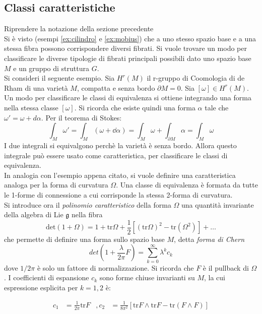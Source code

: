 \subsection{Classi caratteristiche}
Riprendere la notazione della sezione precedente \\

Si è visto (esempi \ref{ex:cilindro} e \ref{ex:mobius}) che a uno stesso spazio
base e a una stessa fibra possono corrispondere diversi fibrati. Si vuole trovare
un modo per classificare le diverse tipologie di fibrati principali possibili dato uno
spazio base $M$ e un gruppo di struttura $G$.\\

Si consideri il seguente esempio. Sia $H^r(M)$ il r-gruppo di Coomologia di de Rham
di una varietà $M$, compatta e senza bordo $\partial M = 0$.
Sia $[\omega] \in H^r(M)$.\\
Un modo per classificare le classi di equivalenza si ottiene integrando una forma
nella stessa classe $[\omega]$. Si ricorda che esiste quindi una forma $\alpha$
tale che $\omega' = \omega + d\alpha$. Per il teorema di Stokes:
$$ \int_M \omega' = \int_M (\omega + \dd \alpha) = \int_M \omega
   + \int_{\partial M} \alpha = \int_M \omega $$
I due integrali si equivalgono perchè la varietà è senza bordo. Allora questo integrale
può essere usato come caratteristica, per classificare le classi di equivalenza.\\

In analogia con l'esempio appena citato, si vuole definire una caratteristica
analoga per la forma di curvatura $\Omega$. Una classe di equivalenza è formata
da tutte le 1-forme di connessione a cui corrisponde la stessa 2-forma di curvatura.\\
Si introduce ora il \emph{polinomio caratteristico} della forma $\Omega$ una quantità
invariante della algebra di Lie $\mathfrak{g}$ nella fibra
%
$$
   \mathrm{det}(1+\Omega) = 1 + \mathrm{tr}\Omega
      + \frac{1}{2}[ ( \mathrm{tr}\Omega )^2 - \mathrm{tr}(\Omega^2) ] + \dots
$$
%
che permette di definire una forma sullo spazio base $M$, detta \emph{forma di Chern}
$$ det\left(1 + \frac{\lambda}{2\pi}F\right) = \sum_{k=0}^\infty \lambda^k c_k $$
dove $1/2\pi$ è solo un fattore di normalizzazione. Si ricorda che $F$ è il pullback
di $\Omega$. I coefficienti di espansione $c_k$ sono forme chiuse invarianti su $M$,
la cui espressione esplicita per $k = 1,2$ è:

\begin{equation}
   \begin{aligned}
      c_1 &= \frac{1}{2\pi} \mathrm{tr} F &,
      c_2 & = \frac{1}{8\pi^2}[ \mathrm{tr} F \wedge \mathrm{tr} F
           - \mathrm{tr} (F \wedge F)]
   \end{aligned}
\end{equation}

